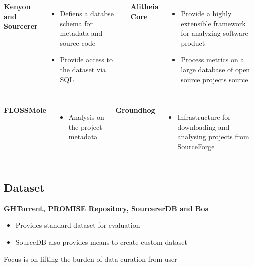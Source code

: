         \begin{frame}
            \begin{columns}
                    \textbf{Kenyon and Sourcerer}
                    \begin{itemize}
                      \item Defiens a databse schema for metadata and source code
                      \item Provide access to the dataset via SQL
                    \end{itemize}

                    \textbf{Alitheia Core}
                    \begin{itemize}
                      \item Provide a highly extensible framework for analyzing software product
                      \item Process metrics on a large database of open source projects source
                    \end{itemize}
            \end{columns}
         \end{frame}

        \begin{frame}
            \begin{columns}
                    \textbf{FLOSSMole}
                    \begin{itemize}
                      \item Analysis on the project metadata
                    \end{itemize}

                    \textbf{Groundhog}
                    \begin{itemize}
                      \item Infrastructure for downloading and analysing projects from SourceForge
                    \end{itemize}
            \end{columns}
        \end{frame}


    \subsection{Dataset}
        \begin{frame}
        \textbf{GHTorrent, PROMISE Repository, SourcererDB and Boa}
           \begin{itemize}
                \item Provides standard dataset for evaluation
                \item SourceDB also provides means to create custom dataset
            \end{itemize}
            Focus is on lifting the burden of data curation from user
        \end{frame}

